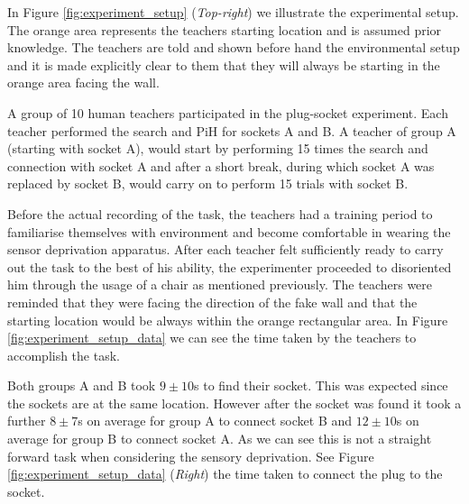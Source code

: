 In Figure \ref{fig:experiment_setup} (\textit{Top-right}) we illustrate the experimental setup. The orange area represents 
the teachers starting location and is assumed prior knowledge. The teachers are told and shown before hand the 
environmental setup and it is made explicitly clear to them that they will always be starting in the orange 
area facing the wall. 

A group of 10 human teachers participated in the plug-socket experiment. Each teacher performed the search and PiH 
for sockets A and B. A teacher of group A (starting with socket A), would start by performing 15 times the search and connection 
with socket A and after a short break, during which socket A was replaced by socket B, would carry on to perform 15 trials 
with socket B.

Before the actual recording of the task, the teachers had a training period to familiarise themselves 
with environment and become comfortable in wearing the sensor deprivation apparatus. After each teacher felt sufficiently
ready to carry out the task to the best of his ability, the experimenter proceeded to disoriented him through 
the usage of a chair as mentioned previously. The teachers were reminded that they were facing the direction of 
the fake wall and that the starting location would be always within the orange rectangular area. 
In Figure \ref{fig:experiment_setup_data} we can see the time taken by the teachers to accomplish the task. 

Both groups A and B took $9\pm10$s to find their socket. This was expected since the sockets 
are at the same location. However after the socket was found it took a further $8\pm7$s on average for group A to connect
socket B and $12\pm10$s on average for group B to connect socket A. As we can see this is not a straight forward task when considering
the sensory deprivation. See Figure \ref{fig:experiment_setup_data} (\textit{Right}) the time taken to connect the plug to the socket.

